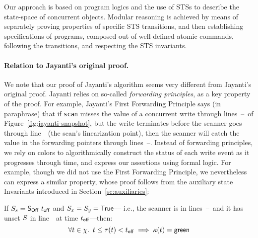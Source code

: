 Our approach is based on program logics and the use of STSs to describe the
state-space of concurrent objects. Modular reasoning is achieved by
means of separately proving properties of specific STS transitions,
and then establishing specifications of programs, composed out of
well-defined atomic commands, following the transitions, and respecting
the STS invariants.

\paragraph{Relation to Jayanti's original proof.}
\label{sec:relat-jayant-orig}

We note that our proof of Jayanti's algorithm seems very different
from Jayanti's original proof. Jayanti relies on so-called
\emph{forwarding principles}, as a key property of the proof. For
example, Jayanti's First Forwarding Principle says (in paraphrase)
that if {\tt scan} misses the value of a concurrent write through
lines~\lineScanReadsX--\lineScanReadsY\ of
Figure~\ref{fig:jayanti-snapshot}, but the write terminates before the
scanner goes through line~\lineScanUnsetsS\ (the scan's linearization
point), then the scanner will catch the value in the forwarding
pointers through lines~\lineScanReadsFX--\lineScanReadsFY.
%
Instead of forwarding principles, we rely on colors to algorithmically
construct the status of each write event as it progresses through
time, and express our assertions using formal logic. For example,
though we did not use the First Forwarding Principle, we nevertheless
can express a similar property, whose proof follows from the auxiliary
state Invariants introduced in Section~\ref{sc:auxiliaries}:
%
\begin{myprop}\label{inv:fwd1}%
If $S_s = \mathsf{S_{Off}}\ t_{\mathsf{off}}$ and $S_x = S_y = \mathsf{True}$--- i.e., the scanner is
in lines~\lineScanReadsFX--\lineScanReadsFY\ and it has unset $S$ in
line~\lineScanUnsetsS\ at time $t_{\mathsf{off}}$---then:
%
\[\forall t \in
  \chi\mathord{.}\,\ t \leq \tau(t)< t_{\mathsf{off}} \implies \kappa(t)= \mathsf{green}\]
\end{myprop}
%
%
%

